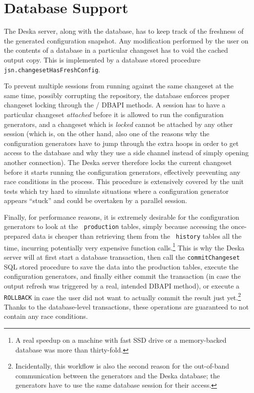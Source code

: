 \documentclass[deska]{subfiles}
\begin{document}
\section{Database Support}
\label{sec:cfggen-db-support}

The Deska server, along with the database, has to keep track of the freshness of the generated configuration snapshot.
Any modification performed by the user on the contents of a database in a particular changeset has to void the cached
output copy.  This is implemented by a database stored procedure {\tt jsn.changesetHasFreshConfig}.

To prevent multiple sessions from running against the same changeset at the same time, possibly corrupting the
repository, the database enforces proper changeset locking through the
/ DBAPI methods.  A session has to have a
particular changeset {\em attached} before it is allowed to run the configuration generators, and a changeset which is
{\em locked} cannot be attached by any other session (which is, on the other hand, also one of the reasons why the
configuration generators have to jump through the extra hoops in order to get access to the database and why they use a
side channel instead of simply opening another connection).  The Deska server therefore locks the current changeset
before it starts running the configuration generators, effectively preventing any race conditions in the process.  This
procedure is extensively covered by the unit tests which try hard to simulate situations where a configuration generator
appears ``stuck'' and could be overtaken by a parallel session.

Finally, for performance reasons, it is extremely desirable for the configuration generators to look at the {\tt
production} tables, simply because accessing the once-prepared data is cheaper than retrieving them from the {\tt
history} tables all the time, incurring potentially very expensive function calls.\footnote{A real speedup on a machine
with fast SSD drive or a memory-backed database was more than thirty-fold.}  This is why the Deska server will at
first start a database transaction, then call the {\tt commitChangeset} SQL stored procedure to save the data into the
production tables, execute the configuration generators, and finally either commit the transaction (in case the
output refresh was triggered by a real, intended  DBAPI method), or execute a {\tt
ROLLBACK} in case the user did not want to actually commit the result just yet.\footnote{Incidentally, this workflow is
also the second reason for the out-of-band communication between the generators and the Deska database; the generators
have to use the same database session for their access.} Thanks to the database-level transactions, these operations are
guaranteed to not contain any race conditions.
\end{document}
